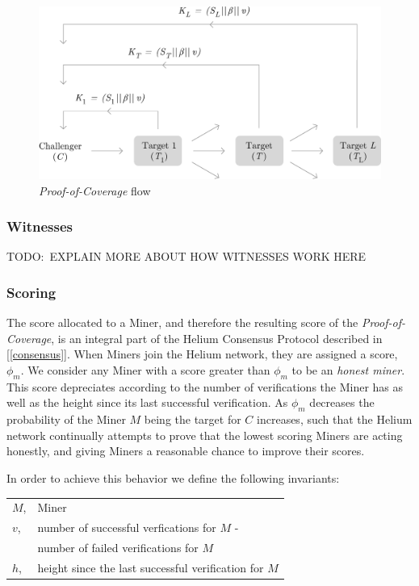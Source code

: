 \documentclass[10pt, nonatbib, nocopyrightspace, reprint]{sigplanconf}
\newcommand{\todo}[1]{}
\renewcommand{\todo}[1]{{\color{red} TODO:\ {#1}}}
\newcommand{\secref}[1]{[\autoref{#1}]}
\begin{document}
\begin{figure}[ht]
    \begin{center}
          \includegraphics[width=\columnwidth]{o_propagation.eps}
          \caption{\emph{Proof-of-Coverage} flow}\label{fig:poc-propogation}
     \end{center}
\end{figure}

\subsubsection{Witnesses}

\todo{EXPLAIN MORE ABOUT HOW WITNESSES WORK HERE}

\subsubsection{Scoring}\label{scores}

The score allocated to a Miner, and therefore the resulting score of the \emph{Proof-of-Coverage}, is an integral part of the Helium Consensus Protocol described in \secref{consensus}. When Miners join the Helium network, they are assigned a score, $\phi_m$. We consider any Miner with a score greater than $\phi_m$ to be an \emph{honest miner}. This score depreciates according to the number of verifications the Miner has as well as the height since its last successful verification. As $\phi_m$ decreases the probability of the Miner $M$ being the target for $C$ increases, such that the Helium network continually attempts to prove that the lowest scoring Miners are acting honestly, and giving Miners a reasonable chance to improve their scores.

In order to achieve this behavior we define the following invariants:

\begin{tabular}{l l}
        $M$, & Miner                                         \\
        $v$, &number of successful verfications for $M$ -\\
        & number of failed verifications for $M$ \\
        $h$,          & height since the last successful verification for $M$\\
\end{tabular}
\end{document}
